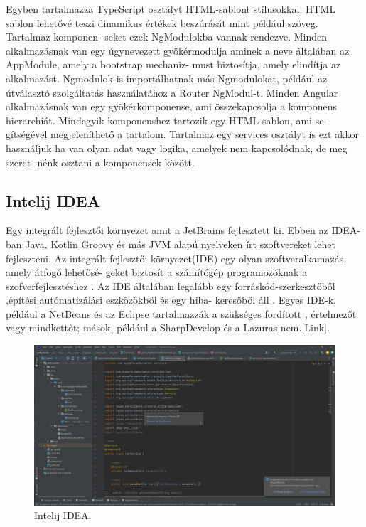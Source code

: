 Egyben tartalmazza TypeScript osztályt HTML-sablont stílusokkal. HTML sablon lehetővé teszi dinamikus értékek beszúrását mint például szöveg. Tartalmaz komponen-
seket ezek NgModulokba vannak rendezve. Minden alkalmazásnak van egy úgynevezett gyökérmodulja aminek a neve általában az AppModule, amely a bootstrap mechaniz-
must biztosítja, amely elindítja az alkalmazást. Ngmodulok is importálhatnak más Ngmodulokat, például az útválasztó szolgáltatás használatához a Router NgModul-t.  Minden Angular alkalmazásnak van egy gyökérkomponense, ami összekapcsolja a komponens hierarchiát. Mindegyik komponenshez tartozik egy HTML-sablon, ami se-
gítségével megjeleníthető a tartalom. Tartalmaz egy services osztályt is ezt akkor használjuk ha van olyan adat vagy logika, amelyek nem kapcsolódnak, de meg szeret-
nénk osztani a komponensek között.


\subsection{Intelij IDEA}

Egy integrált fejlesztői környezet amit a JetBrains fejlesztett ki. Ebben az IDEA-ban Java, Kotlin Groovy és más JVM alapú nyelveken írt szoftvereket lehet fejleszteni. Az integrált fejlesztői környezet(IDE)  egy olyan  szoftveralkamazás, amely átfogó lehetősé-
geket biztosít a számítógép programozóknak a szofverfejlesztéshez . Az IDE általában legalább egy forráskód-szerkesztőből ,építési autómatizálási eszközökből és egy hiba-
keresőből áll . Egyes IDE-k, például a NetBeans és az Eclipse tartalmazzák a szükséges fordított , értelmezőt vagy mindkettőt; mások, például a SharpDevelop és a Lazuras nem.[Link].
\newpage

\begin{figure}[h]
\centering
\includegraphics[scale=1]{images/Intelij.png}
\caption{Intelij IDEA.}
\label{fig:Intelij}
\end{figure}

